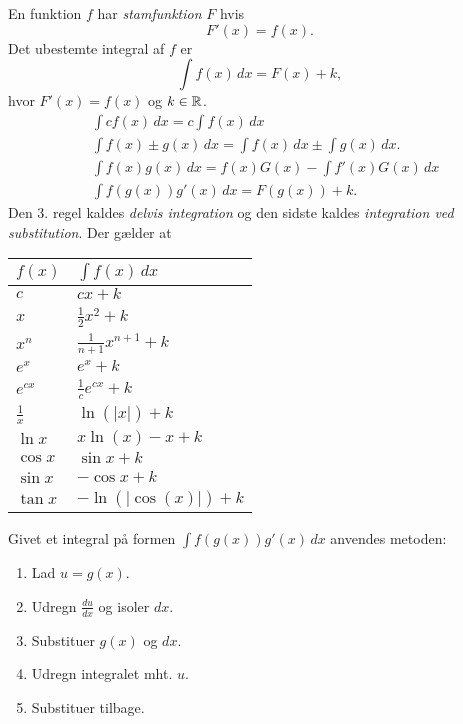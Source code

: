 En funktion $f$ har \emph{stamfunktion} $F$ hvis
\begin{equation*}
F'(x)=f(x).
\end{equation*}
Det ubestemte integral af $f$ er
\begin{equation*}
\int f(x)\, dx =F(x)+k,
\end{equation*}
hvor $F'(x)=f(x)$ og $k\in \mathbb{R}$.
\begin{align*}
&\int cf(x) \, d x=c\int f(x)\, dx\\
&\int f(x)\pm g(x) \, d x=\!\!\!\!\!\int f(x)\, dx\pm \!\!\!\!\int g(x) \, dx.\\
&\int f(x)g(x)\, dx=\!\!\!f(x)G(x)-\!\!\!\!\int\!\!\!\! f'(x)G(x)\, dx\\
&\int f(g(x))g'(x)\, dx =F(g(x))+k.
\end{align*}
Den 3. regel kaldes \emph{delvis integration} og den sidste kaldes \emph{integration ved substitution}.
Der gælder at
\begin{center}
		\begin{tabular}{@{}l l@{}}
		$f(x)$      & $\int f(x)\, dx$  				\\ \toprule
		$c$			& $cx+k$ 							\\ \midrule
		$x$			& $\frac{1}{2}x^2+k$				\\ \midrule
		$x^n$  		& $\frac{1}{n+1}x^{n+1}+k$			\\ \midrule
		$e^x$  		& $e^x+k$							\\ \midrule
		$e^{cx}$  	& $\frac{1}{c}e^{cx}+k$				\\ \midrule
		$\frac{1}{x}$ & $\ln(\vert x\vert)+k $			\\ \midrule
		$\ln x$ 	& $x\ln(x)-x+k$						\\ \midrule
		$\cos x$  	& $\sin x+k$						\\ \midrule
		$\sin x$  	& $-\cos x+k$						\\ \midrule
		$\tan x$ 	& $-\ln(\vert \cos(x)\vert)+k$		\\ \bottomrule  
	\end{tabular}
\end{center}
Givet et integral på formen $\int f(g(x))g'(x)\, dx$ anvendes metoden:
\begin{enumerate}
	\item Lad $u=g(x)$.
	\item Udregn $\frac{du}{dx}$ og isoler $dx$.
	\item Substituer $g(x)$ og $dx$.
	\item Udregn integralet mht. $u$.
	\item Substituer tilbage.
\end{enumerate}
